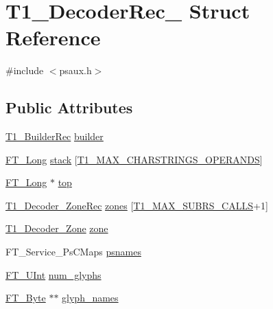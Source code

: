 \hypertarget{struct_t1___decoder_rec__}{\section{T1\-\_\-\-Decoder\-Rec\-\_\- Struct Reference}
\label{struct_t1___decoder_rec__}
}


{\ttfamily \#include $<$psaux.\-h$>$}

\subsection*{Public Attributes}
\begin{DoxyCompactItemize}
\item 
\hyperlink{psaux_8h_a50915d5a0a17cb729e88544f7e74e791}{T1\-\_\-\-Builder\-Rec} \hyperlink{struct_t1___decoder_rec___a75fd9f539974efe45107ce602dc9ea1b}{builder}
\item 
\hyperlink{fttypes_8h_a7fa72a1f0e79fb1860c5965789024d6f}{F\-T\-\_\-\-Long} \hyperlink{struct_t1___decoder_rec___af0def194d1b8f9b68f1750820a19bb3f}{stack} \mbox{[}\hyperlink{ftoption_8h_a2d9bf92424fd81e25c1ed03f80bb5c80}{T1\-\_\-\-M\-A\-X\-\_\-\-C\-H\-A\-R\-S\-T\-R\-I\-N\-G\-S\-\_\-\-O\-P\-E\-R\-A\-N\-D\-S}\mbox{]}
\item 
\hyperlink{fttypes_8h_a7fa72a1f0e79fb1860c5965789024d6f}{F\-T\-\_\-\-Long} $\ast$ \hyperlink{struct_t1___decoder_rec___a5f26aa85b1859f23427b7aba9008f126}{top}
\item 
\hyperlink{psaux_8h_a1e1e25f5a6878f28ed803ad26941d841}{T1\-\_\-\-Decoder\-\_\-\-Zone\-Rec} \hyperlink{struct_t1___decoder_rec___a4e33201df5beec8a3d81eca726b09ea5}{zones} \mbox{[}\hyperlink{ftoption_8h_aa9c844460223f004a1916df4b7a831f4}{T1\-\_\-\-M\-A\-X\-\_\-\-S\-U\-B\-R\-S\-\_\-\-C\-A\-L\-L\-S}+1\mbox{]}
\item 
\hyperlink{psaux_8h_a5cfd02fa4e8c74f182585e0853bc93b2}{T1\-\_\-\-Decoder\-\_\-\-Zone} \hyperlink{struct_t1___decoder_rec___add29399f0c811404b9d6ca373793103e}{zone}
\item 
F\-T\-\_\-\-Service\-\_\-\-Ps\-C\-Maps \hyperlink{struct_t1___decoder_rec___ac1c3efd334618c670c6e2b975829e926}{psnames}
\item 
\hyperlink{fttypes_8h_abcb8db4dbf35d2b55a9e8c7b0926dc52}{F\-T\-\_\-\-U\-Int} \hyperlink{struct_t1___decoder_rec___a1ae08137c5931f34db9c3bb864b17712}{num\-\_\-glyphs}
\item 
\hyperlink{fttypes_8h_a51f26183ca0c9f4af958939648caeccd}{F\-T\-\_\-\-Byte} $\ast$$\ast$ \hyperlink{struct_t1___decoder_rec___acb8be0bdd36652cd4383754698b5b44a}{glyph\-\_\-names}
$$
\end{DoxyCompactItemize}
